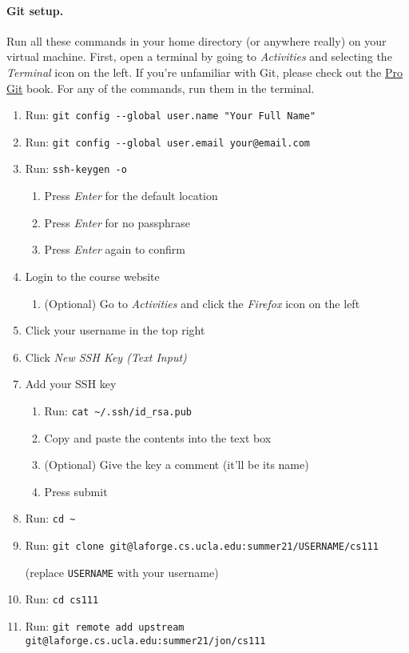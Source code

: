\paragraph{Git setup.}
Run all these commands in your home directory (or anywhere really) on your
virtual machine.
First, open a terminal by going to \textit{Activities} and selecting the
\textit{Terminal} icon on the left.
If you're unfamiliar with Git, please check out the
\href{https://git-scm.com/book/en/v2/}{Pro Git} book.
For any of the commands, run them in the terminal.

\begin{enumerate}
  \item Run: \lstinline|git config --global user.name "Your Full Name"|
  \item Run: \lstinline|git config --global user.email your@email.com|
  \item Run: \lstinline|ssh-keygen -o|
    \begin{enumerate}
      \item Press \textit{Enter} for the default location
      \item Press \textit{Enter} for no passphrase
      \item Press \textit{Enter} again to confirm
    \end{enumerate}
  \item Login to the course website
    \begin{enumerate}
      \item (Optional) Go to \textit{Activities} and click the \textit{Firefox}
            icon on the left
    \end{enumerate}
  \item Click your username in the top right
  \item Click \textit{New SSH Key (Text Input)}
  \item Add your SSH key
    \begin{enumerate}
      \item Run: \lstinline|cat ~/.ssh/id_rsa.pub|
      \item Copy and paste the contents into the text box
      \item (Optional) Give the key a comment (it'll be its name)
      \item Press submit
    \end{enumerate}
  
  \item Run: \lstinline|cd ~|
  \item Run: \lstinline|git clone git@laforge.cs.ucla.edu:summer21/USERNAME/cs111|

        (replace \texttt{USERNAME} with your username)
  \item Run: \lstinline|cd cs111|
  \item Run: \lstinline|git remote add upstream git@laforge.cs.ucla.edu:summer21/jon/cs111|
\end{enumerate}

